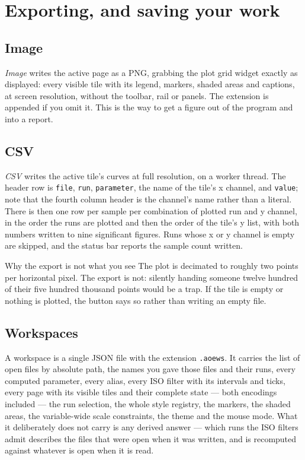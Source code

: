 \documentclass[11pt,a4paper,oneside]{report}
\newcommand{\code}[1]{\texttt{#1}}
\begin{document}
\chapter{Exporting, and saving your work}

\section{Image}

\emph{Image} writes the active page as a PNG, grabbing the plot grid widget
exactly as displayed: every visible tile with its legend, markers, shaded areas
and captions, at screen resolution, without the toolbar, rail or panels. The
extension is appended if you omit it. This is the way to get a figure out of the
program and into a report.

\section{CSV}

\emph{CSV} writes the active tile's curves at full resolution, on a worker
thread. The header row is \code{file}, \code{run}, \code{parameter}, the name of
the tile's x channel, and \code{value}; note that the fourth column header is the
channel's name rather than a literal. There is then one row per sample per
combination of plotted run and y channel, in the order the runs are plotted and
then the order of the tile's y list, with both numbers written to nine
significant figures. Runs whose x or y channel is empty are skipped, and the
status bar reports the sample count written.

\begin{aoenote}{Why the export is not what you see}
The plot is decimated to roughly two points per horizontal pixel. The export is
not: silently handing someone twelve hundred of their five hundred thousand
points would be a trap. If the tile is empty or nothing is plotted, the button
says so rather than writing an empty file.
\end{aoenote}

\section{Workspaces}
\label{sec:workspaces}

A workspace is a single JSON file with the extension \code{.aoews}. It carries
the list of open files by absolute path, the names you gave those files and their
runs, every computed parameter, every alias, every ISO filter with its intervals
and ticks, every page with its visible tiles and their complete state --- both
encodings included --- the run selection, the whole style registry, the markers,
the shaded areas, the variable-wide scale constraints, the theme and the mouse
mode. What it deliberately does not carry is any derived answer --- which runs
the ISO filters admit describes the files that were open when it was written, and
is recomputed against whatever is open when it is read.
\end{document}

